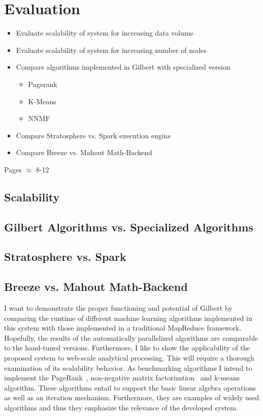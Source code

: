 \chapter{Evaluation}
\label{cha:evaluation}

\begin{itemize}
	\item Evaluate scalability of system for increasing data volume
	\item Evaluate scalability of system for increasing number of nodes
	\item Compare algorithms implemented in Gilbert with specialized version
	\begin{itemize}
		\item Pagerank
		\item K-Means
		\item NNMF
	\end{itemize}
	\item Compare Stratosphere vs. Spark execution engine
	\item Compare Breeze vs. Mahout Math-Backend
\end{itemize}

Pages $\approx$ 8-12

\section{Scalability}

\section{Gilbert Algorithms vs. Specialized Algorithms}

\section{Stratosphere vs. Spark}

\section{Breeze vs. Mahout Math-Backend}

I want to demonstrate the proper functioning and potential of Gilbert by comparing the runtime of different machine learning algorithms implemented in this system with those implemented in a traditional MapReduce framework.
Hopefully, the results of the automatically parallelized algorithms are comparable to the hand-tuned versions.
Furthermore, I like to show the applicability of the proposed system to web-scale analytical processing.
This will require a thorough examination of its scalability behavior.
As benchmarking algorithms I intend to implement the PageRank~\cite{page:1999a}, non-negative matrix factorization~\cite{seung:anips2001a} and k-means~\cite{macqueen:1967a} algorithm.
These algorithms entail to support the basic linear algebra operations as well as an iteration mechanism.
Furthermore, they are examples of widely used algorithms and thus they emphasize the relevance of the developed system.